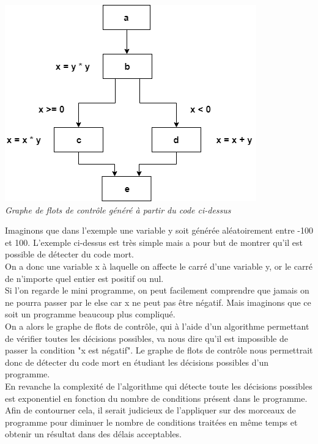 \documentclass[a4paper,twoside,12pt,openright]{report}
\begin{document}
\begin{center}
\includegraphics[scale=1]{Image/ExempleGraphe.png}\\
\itshape{Graphe de flots de contrôle généré à partir du code ci-dessus}
\end{center}

Imaginons que dans l'exemple une variable y soit générée aléatoirement entre -100 et 100.
L'exemple ci-dessus est très simple mais a pour but de montrer qu'il est possible de détecter du code mort.\\
On a donc une variable x à laquelle on affecte le carré d'une variable y, or le carré de n'importe quel entier est positif ou nul.\\ Si l'on regarde le mini programme, on peut facilement comprendre que jamais on ne pourra passer par le else car x ne peut pas être négatif. Mais imaginons que ce soit un programme beaucoup plus compliqué.\\ On a alors le graphe de flots de contrôle, qui à l'aide d'un algorithme permettant de vérifier toutes les décisions possibles, va nous dire qu'il est impossible de passer la condition "x est négatif". Le graphe de flots de contrôle nous permettrait donc de détecter du code mort en étudiant les décisions possibles d'un programme.\\
En revanche la complexité de l'algorithme qui détecte toute les décisions possibles est exponentiel en fonction du nombre de conditions présent dans le programme.\\
Afin de contourner cela, il serait judicieux de l'appliquer sur des morceaux de programme pour diminuer le nombre de conditions traitées en même temps et obtenir un résultat dans des délais acceptables.\\
\end{document}
